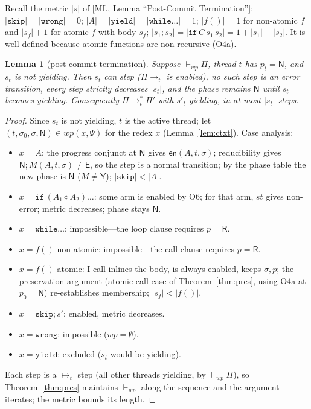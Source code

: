 \documentclass[11pt]{article}
\theoremstyle{plain}
\newtheorem{lemma}{Lemma}
\theoremstyle{plain}
\theoremstyle{definition}
\newcommand{\MY}{\mathsf{Y}}
\newcommand{\MR}{\mathsf{R}}
\newcommand{\MN}{\mathsf{N}}
\newcommand{\ME}{\mathsf{E}}
\newcommand{\wpx}{\mathit{wp}}
\newcommand{\stp}{\mathit{st}}
\newcommand{\en}{\mathsf{en}}
\newcommand{\vdashwp}{\vdash_{\mathit{wp}}}
\newcommand{\tskip}{\mathtt{skip}}
\newcommand{\twrong}{\mathtt{wrong}}
\newcommand{\tyield}{\mathtt{yield}}
\newcommand{\kif}{\mathtt{if}}
\newcommand{\kwhile}{\mathtt{while}}
\newcommand{\cact}[2]{#1\diamond #2}                 %
\begin{document}
Recall the metric $|s|$ of [ML, Lemma ``Post-Commit Termination'']:
$|\tskip|=|\twrong|=0$; $|A|=|\tyield|=|\kwhile\ldots|=1$; $|f()|=1$ for
non-atomic $f$ and $|s_f|+1$ for atomic $f$ with body $s_f$;
$|s_1;s_2|=|\kif\,C\,s_1\,s_2|=1+|s_1|+|s_2|$. It is well-defined because atomic
functions are non-recursive (O4a).

\begin{lemma}[post-commit termination]\label{lem:pct}
Suppose $\vdashwp\Pi$, thread $t$ has $p_t=\MN$, and $s_t$ is not yielding. Then
$s_t$ can step ($\Pi\to_t$ is enabled), no such step is an error transition, every
step strictly decreases $|s_t|$, and the phase remains $\MN$ until $s_t$ becomes
yielding. Consequently $\Pi\to_t^*\Pi'$ with $s'_t$ yielding, in at most $|s_t|$
steps.
\end{lemma}
\begin{proof}
Since $s_t$ is not yielding, $t$ is the active thread; let
$(t,\sigma_0,\sigma,\MN)\in\wpx(x,\Psi)$ for the redex $x$ (Lemma~\ref{lem:ctxt}).
Case analysis:
\begin{itemize}[leftmargin=1.4em]
\item $x=A$: the progress conjunct at $\MN$ gives $\en(A,t,\sigma)$; reducibility
  gives $\MN;M(A,t,\sigma)\neq\ME$, so the step is a normal transition; by the phase
  table the new phase is $\MN$ ($M\neq\MY$); $|\tskip|<|A|$.
\item $x=\kif\,(\cact{A_1}{A_2})\ldots$: some arm is enabled by O6; for that arm,
  $\stp$ gives non-error; metric decreases; phase stays $\MN$.
\item $x=\kwhile\ldots$: impossible---the loop clause requires $p=\MR$.
\item $x=f()$ non-atomic: impossible---the call clause requires $p=\MR$.
\item $x=f()$ atomic: I-call inlines the body, is always enabled, keeps
  $\sigma,p$; the preservation argument (atomic-call case of
  Theorem~\ref{thm:pres}, using O4a at $p_0=\MN$) re-establishes membership;
  $|s_f|<|f()|$.
\item $x=\tskip;s'$: enabled, metric decreases.
\item $x=\twrong$: impossible ($\wpx=\emptyset$).
\item $x=\tyield$: excluded ($s_t$ would be yielding).
\end{itemize}
Each step is a $\mapsto_t$ step (all other threads yielding, by $\vdashwp\Pi$), so
Theorem~\ref{thm:pres} maintains $\vdashwp$ along the sequence and the argument
iterates; the metric bounds its length.
\end{proof}
\end{document}

